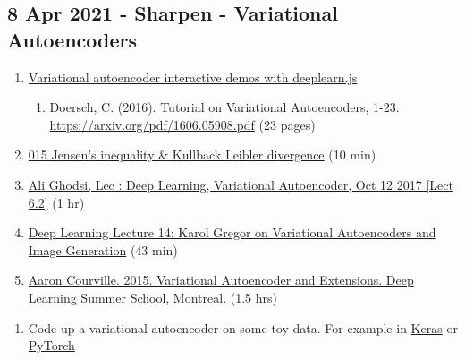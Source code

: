 \documentclass[11pt, oneside]{article}   	%
\begin{document}
\subsection{8 Apr 2021 - Sharpen - Variational Autoencoders }
\begin{enumerate}
	\item \href{https://www.siarez.com/projects/variational-autoencoder}{Variational autoencoder interactive demos with deeplearn.js}
	\begin{enumerate}
		\item Doersch, C. (2016). Tutorial on Variational Autoencoders, 1-23. \url{https://arxiv.org/pdf/1606.05908.pdf} (23 pages)
	\end{enumerate}
	\item \href{https://youtu.be/_2PZxw4FzDU}{015 Jensen's inequality \& Kullback Leibler divergence} (10 min)
	\item \href{https://www.youtube.com/watch?v=uaaqyVS9-rM&feature=youtu.be}{Ali Ghodsi, Lec : Deep Learning, Variational Autoencoder, Oct 12 2017 [Lect 6.2]} (1 hr)
	\item \href{https://youtu.be/P78QYjWh5sM}{Deep Learning Lecture 14: Karol Gregor on Variational Autoencoders and Image Generation} (43 min)
	\item \href{http://videolectures.net/deeplearning2015_courville_autoencoder_extension/}{Aaron Courville. 2015. Variational Autoencoder and Extensions. Deep Learning Summer School, Montreal.} (1.5 hrs)
\end{enumerate}
\begin{enumerate}
	\item Code up a variational autoencoder on some toy data. For example in \href{https://tiao.io/post/tutorial-on-variational-autoencoders-with-a-concise-keras-implementation/}{Keras} or \href{https://towardsdatascience.com/variational-autoencoder-demystified-with-pytorch-implementation-3a06bee395ed}{PyTorch}
\end{enumerate}
\end{document}

